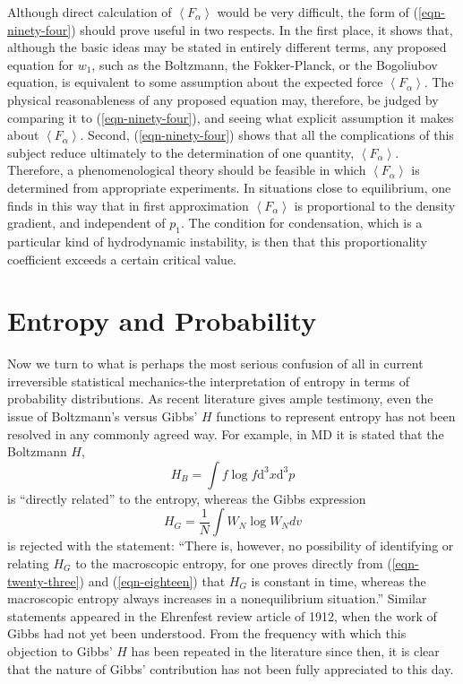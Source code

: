 \documentclass[]{article}
\begin{document}
Although direct calculation of $\left\langle F_{\alpha}\right\rangle$ would be very difficult, the form of (\ref{eqn-ninety-four}) should prove useful in two respects. In the first place, it shows that, although the basic ideas may be stated in entirely different terms, any proposed equation for $w_{1}$, such as the Boltzmann, the Fokker-Planck, or the Bogoliubov equation, is equivalent to some assumption about the expected force $\left\langle F _{\alpha}\right\rangle$. The physical reasonableness of any proposed equation may, therefore, be judged by comparing it to (\ref{eqn-ninety-four}), and seeing what explicit assumption it makes about $\left\langle F _{\alpha}\right\rangle$. Second, (\ref{eqn-ninety-four}) shows that all the complications of this subject reduce ultimately to the determination of one quantity, $\left\langle F _{\alpha}\right\rangle$. Therefore, a phenomenological theory should be feasible in which $\left\langle F_{\alpha}\right\rangle$ is determined from appropriate experiments. In situations close to equilibrium, one finds in this way that in first approximation $\left\langle F _{\alpha}\right\rangle$ is proportional to the density gradient, and independent of $p _{1}$. The condition for condensation, which is a particular kind of hydrodynamic instability, is then that this proportionality coefficient exceeds a certain critical value.

\section{Entropy and Probability}

Now we turn to what is perhaps the most serious confusion of all in current irreversible statistical mechanics-the interpretation of entropy in terms of probability distributions. As recent literature gives ample testimony, even the issue of Boltzmann's versus Gibbs' $H$ functions to represent entropy has not been resolved in any commonly agreed way. For example, in MD it is stated that the Boltzmann $H$,
\begin{equation}
H_{B}=\int f \log f\text{d}^{3} x\text{d}^{3} p \label{eqn-ninety-six}
\end{equation}
is ``directly related'' to the entropy, whereas the Gibbs expression
\begin{equation}
H _{ G }=\frac{1}{ N } \int W _{ N } \log W _{ N } dv
\end{equation}
is rejected with the statement: ``There is, however, no possibility of identifying or relating $H _{ G }$ to the macroscopic entropy, for one proves directly from (\ref{eqn-twenty-three}) and (\ref{eqn-eighteen}) that $H _{G}$ is constant in time, whereas the macroscopic entropy always increases in a nonequilibrium situation.'' Similar statements appeared in the Ehrenfest\citep{Ehrenfest-begriffliche11} review article of 1912, when the work of Gibbs had not yet been understood. From the frequency with which this objection to Gibbs' $H$ has been repeated in the literature since then, it is clear that the nature of Gibbs' contribution has not been fully appreciated to this day.
\end{document}
